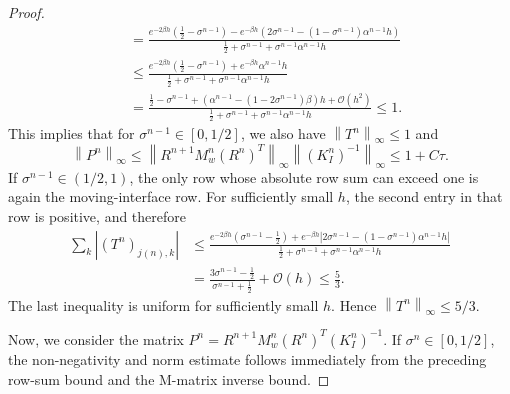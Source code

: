 \documentclass[11pt,reqno]{amsart}
\theoremstyle{plain}
\theoremstyle{definition}
\numberwithin{equation}{section}
\newcommand{\paren}[1]{\left(#1\right)}
\newcommand{\mc}[1]{\mathcal{#1}}
\newcommand{\abs}[1]{\left\lvert #1 \right\rvert}
\newcommand{\norm}[1]{\left\lVert #1 \right\rVert}
\begin{document}
\begin{proof}
\begin{equation}
\begin{aligned}
    &= \frac{ e^{-2\beta h}\paren{\frac{1}{2}-\sigma^{n-1}} - e^{-\beta h}\paren{ 2\sigma^{n-1} - \paren{1-\sigma^{n-1}} \alpha^{n-1} h }}{ \frac{1}{2} + \sigma^{n-1} + \sigma^{n-1} \alpha^{n-1} h } \\
     &\le \frac{ e^{-2\beta h}\paren{\frac{1}{2}-\sigma^{n-1}} + e^{-\beta h} \alpha^{n-1} h }{ \frac{1}{2} + \sigma^{n-1} + \sigma^{n-1} \alpha^{n-1} h } \\
     &= \frac{ \frac{1}{2}-\sigma^{n-1} + \paren{\alpha^{n-1} - (1-2\sigma^{n-1})\beta}h + \mc O(h^2) }{ \frac{1}{2} + \sigma^{n-1} + \sigma^{n-1} \alpha^{n-1} h }  \le 1.
\end{aligned}
\end{equation}
This implies that for $\sigma^{n-1} \in[0,1/2]$, we also have $\norm{T^n}_\infty \le 1$  and
\begin{equation}
    \norm{P^n}_\infty \le \norm{ R^{n+1} M_w^{n}  (R^{n})^T}_\infty \norm{(K_I^n)^{-1} }_\infty \le 1 + C\tau.
\end{equation}
If $\sigma^{n-1} \in (1/2,1)$, the only row whose absolute row sum can exceed
one is again the moving-interface row. For sufficiently small $h$, the second
entry in that row is positive, and therefore
\begin{equation}
\begin{aligned}
    \sum_k\abs{(T^n)_{j(n),k}}
    &\le
    \frac{ e^{-2\beta h}\paren{\sigma^{n-1}-\frac12}
    + e^{-\beta h}\abs{2\sigma^{n-1}-(1-\sigma^{n-1})\alpha^{n-1}h}}
    {\frac12+\sigma^{n-1}+\sigma^{n-1}\alpha^{n-1}h}  \\
    &=
    \frac{3\sigma^{n-1}-\frac12}{\sigma^{n-1}+\frac12}+\mc O(h)
    \le \frac53 .
\end{aligned}
\end{equation}
The last inequality is uniform for sufficiently small $h$. Hence $\norm{T^n}_\infty\le5/3$.


Now, we consider the matrix $P^n=R^{n+1} M_w^{n} (R^{n})^T(K_I^n)^{-1}$.
If $\sigma^{n}\in[0,1/2]$, the non-negativity and norm estimate follows immediately from the preceding row-sum bound and the M-matrix inverse bound.


\end{proof}
\end{document}
